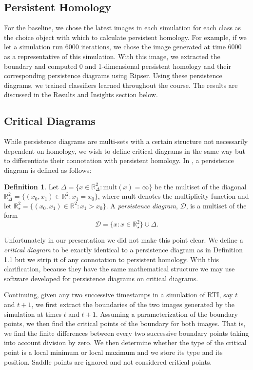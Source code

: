 \documentclass[12pt, fullpage,letterpaper]{article}
\theoremstyle{definition}
\newtheorem{definition}{Definition}[section]
\begin{document}
	\subsection*{\normalfont Persistent Homology}
	For the baseline, we chose the latest images in each simulation for each class as the choice object with which to calculate persistent homology. For example, if we let a simulation run 6000 iterations, we chose the image generated at time 6000 as a representative of this simulation. With this image, we extracted the boundary and computed 0 and 1-dimensional persistent homology and their corresponding persistence diagrams using Ripser. Using these persistence diagrams, we trained classifiers learned throughout the course. The results are discussed in the Results and Insights section below.
	
	\subsection*{\normalfont Critical Diagrams} 
	While persistence diagrams are multi-sets with a certain structure not necessarily dependent on homology, we wish to define critical diagrams in the same way but to differentiate their connotation with persistent homology. In \cite{Hofer}, a persistence diagram is defined as follows:
	\theoremstyle{definition}
	\begin{definition}
		Let $\Delta = \{ x\in \mathbb{R}^2_{\Delta} : \textrm{mult}(x) = \infty \}$ be the multiset of the diagonal $\mathbb{R}^2_{\Delta} = \{ (x_0, x_1) \in \mathbb{R}^2 : x_1 = x_0 \}$, where $\textrm{mult}$ denotes the multiplicity function and let $\mathbb{R}_{\star}^2 = \{ (x_0, x_1) \in \mathbb{R}^2 : x_1 > x_0 \}$. A \emph{persistence diagram}, $\mathcal{D}$, is a multiset of the form
		$$
			\mathcal{D} = \{x: x \in \mathbb{R}_{\star}^2  \} \cup \Delta.
		$$
	\end{definition}
	Unfortunately in our presentation we did not make this point clear. We define a \emph{critical diagram} to be exactly identical to a persistence diagram as in Definition 1.1 but we strip it of any connotation to persistent homology. With this clarification, because they have the same mathematical structure we may use software developed for persistence diagrams on critical diagrams. 
	
	Continuing, given any two successive timestamps in a simulation of RTI, say $t$ and $t + 1$, we first extract the boundaries of the two images generated by the simulation at times $t$ and $t + 1$. Assuming a parameterization of the boundary points, we then find the critical points of the boundary for both images. That is, we find the finite differences between every two successive boundary points taking into account division by zero. We then determine whether the type of the critical point is a local minimum or local maximum and we store its type and its position. Saddle points are ignored and not considered critical points. 
	
\end{document}
